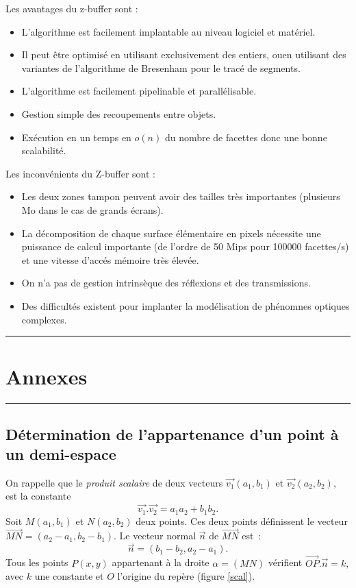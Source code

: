 \documentclass[a4paper,11pt]{amsart}
\begin{document}
Les avantages du z-buffer sont :
\begin{itemize}
\item L'algorithme est facilement implantable au niveau logiciel et 
mat\'eriel.
\item Il peut \^etre 
optimis\'e en utilisant exclusivement des entiers, ouen utilisant des variantes 
de l'algorithme de Bresenham pour le trac\'e de segments.
\item L'algorithme est facilement pipelinable et parall\'elisable.
\item Gestion simple des recoupements entre objets.  
\item Ex\'ecution en un temps en $o(n)$ du nombre de facettes donc une bonne 
scalabilit\'e.
\end{itemize}

Les inconv\'enients du Z-buffer sont :
\begin{itemize}
\item  Les deux zones tampon peuvent avoir des 
tailles tr\`es importantes (plusieurs Mo dans le cas de grands \'ecrans). 
\item La d\'ecomposition de chaque surface \'el\'ementaire en pixels n\'ecessite une 
puissance de calcul importante (de l'ordre de 50 Mips pour 100000 
facettes/s) et une vitesse d'acc\'es m\'emoire tr\`es \'elev\'ee. 
\item  On n'a pas de gestion intrins\`eque des r\'eflexions et des 
transmissions.  
\item Des difficult\'es existent pour implanter la mod\'elisation de ph\'enomnes optiques complexes.  
\end{itemize}

\vfill\newpage\vspace{0.5cm}\hrule
\section{Annexes}
\hrule\vspace{0.5cm}
\subsection{D\'etermination de l'appartenance d'un point \`a un 
demi-espace}
On rappelle que le \emph{produit scalaire} de deux vecteurs 
$\overrightarrow{v_{1}}(a_{1},b_{1})$ et 
$\overrightarrow{v_{2}}(a_{2},b_{2}),$ est la constante   
$$\overrightarrow{v_{1}}.\overrightarrow{v_{2}}=a_{1}a_{2}+b_{1}b_{2}.$$
Soit $M(a_{1},b_{1})$ et $N(a_{2},b_{2})$ deux points.  Ces deux 
points d\'efinissent le vecteur 
$\overrightarrow{MN}=(a_{2}-a_{1},b_{2}-b_{1})$.  Le vecteur normal 
$\overrightarrow{n}$ de $\overrightarrow{MN}$ est~:
$$\overrightarrow{n}=(b_{1}-b_{2},a_{2}-a_{1}).$$ Tous les points 
$P(x,y)$ appartenant \`a la droite $\alpha =(MN)$ v\'erifient
$\overrightarrow{OP}. \overrightarrow{n} = k,$ avec 
$k$ une constante et $O$ l'origine du rep\`ere (figure \ref{scal}). 
\end{document}
